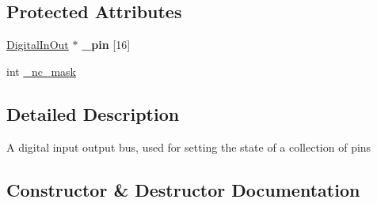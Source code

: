 \subsection*{Protected Attributes}
\begin{DoxyCompactItemize}
\item 
\hyperlink{classmbed_1_1DigitalInOut}{Digital\+In\+Out} $\ast$ {\bfseries \+\_\+pin} \mbox{[}16\mbox{]}\hypertarget{classmbed_1_1BusInOut_acec107fb8d9edde6b8ac0b189f50f055}{}\label{classmbed_1_1BusInOut_acec107fb8d9edde6b8ac0b189f50f055}

\item 
int \hyperlink{classmbed_1_1BusInOut_af4a2854a611341b55a9b62075092a53f}{\+\_\+nc\+\_\+mask}
\end{DoxyCompactItemize}


\subsection{Detailed Description}
A digital input output bus, used for setting the state of a collection of pins 

\subsection{Constructor \& Destructor Documentation}
